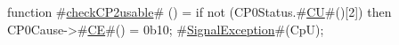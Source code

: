 function #\hyperref[sailMIPSzcheckCP2usable]{checkCP2usable}# ()  =
  if not (CP0Status.#\hyperref[sailMIPSzCU]{CU}#()[2]) then {
    CP0Cause->#\hyperref[sailMIPSzCE]{CE}#() = 0b10;
    #\hyperref[sailMIPSzSignalException]{SignalException}#(CpU);
  }
